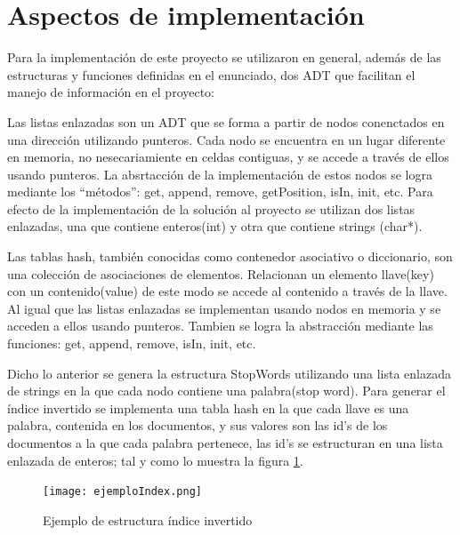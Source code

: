 \documentclass[letterpaper,12pt]{report}
\begin{document}
\section {Aspectos de implementación}

Para la implementación de este proyecto se utilizaron en general, además de las estructuras y funciones definidas en el enunciado, dos ADT que facilitan el manejo de información en el proyecto:

\begin{description}[align=left]

\item [Listas enlazadas:]
    Las listas enlazadas son un ADT que se forma a partir de nodos conenctados en una dirección utilizando punteros. Cada nodo se encuentra en un lugar diferente en memoria, no nesecariamiente en celdas contiguas, y se accede a través de ellos usando punteros. La absrtacción de la implementación de estos nodos se logra mediante los ``métodos'': get, append, remove, getPosition, isIn, init, etc. Para efecto de la implementación de la solución al proyecto se utilizan dos listas enlazadas, una que contiene enteros(int) y otra que contiene strings (char*).

\item [Tabla hash:] 
    Las tablas hash, también conocidas como contenedor asociativo o diccionario, son una colección de asociaciones de elementos. Relacionan un elemento llave(key) con un contenido(value) de este modo se accede al contenido a través de la llave. Al igual que las listas enlazadas se implementan usando nodos en memoria y se acceden a ellos usando punteros. Tambien se logra la abstracción mediante las funciones: get, append, remove, isIn, init, etc.

\end{description} 

Dicho lo anterior se genera la estructura StopWords utilizando una lista enlazada de strings en la que cada nodo contiene una palabra(stop word). Para generar el índice invertido se implementa una tabla hash en la que cada llave es una palabra, contenida en los documentos, y sus valores son las id's de los documentos a la que cada palabra pertenece, las id's se estructuran en una lista enlazada de enteros; tal y como lo muestra la figura \ref{fig:ejemploIndex}.

\begin{figure}[H]
    \centering
    \texttt{[image: ejemploIndex.png]}
    \caption{Ejemplo de estructura índice invertido}
    \label{fig:ejemploIndex}
\end{figure}
\end{document}
